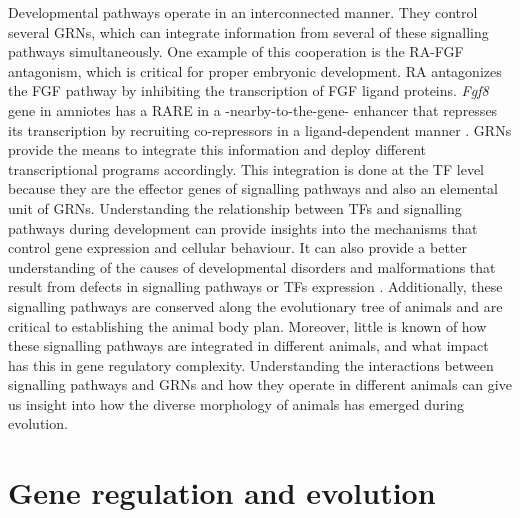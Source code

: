 Developmental pathways operate in an interconnected manner. They control several GRNs, which can integrate information from several of these signalling pathways simultaneously. One example of this cooperation is the RA-FGF antagonism, which is critical for proper embryonic development. RA antagonizes the FGF pathway by inhibiting the transcription of FGF ligand proteins. \textit{Fgf8} gene in amniotes has a RARE in a -nearby-to-the-gene- enhancer that represses its transcription by recruiting co-repressors in a ligand-dependent manner \parencite{kumar_nuclear_2016}. GRNs provide the means to integrate this information and deploy different transcriptional programs accordingly. This integration is done at the TF level because they are the effector genes of signalling pathways and also an elemental unit of GRNs. Understanding the relationship between TFs and signalling pathways during development can provide insights into the mechanisms that control gene expression and cellular behaviour. It can also provide a better understanding of the causes of developmental disorders and malformations that result from defects in signalling pathways or TFs expression \parencite{weidemuller_transcription_2021}. Additionally, these signalling pathways are conserved along the evolutionary tree of animals and are critical to establishing the animal body plan. Moreover, little is known of how these signalling pathways are integrated in different animals, and what impact has this in gene regulatory complexity. Understanding the interactions between signalling pathways and GRNs and how they operate in different animals can give us insight into how the diverse morphology of animals has emerged during evolution.


\chapter{Gene regulation and evolution}

